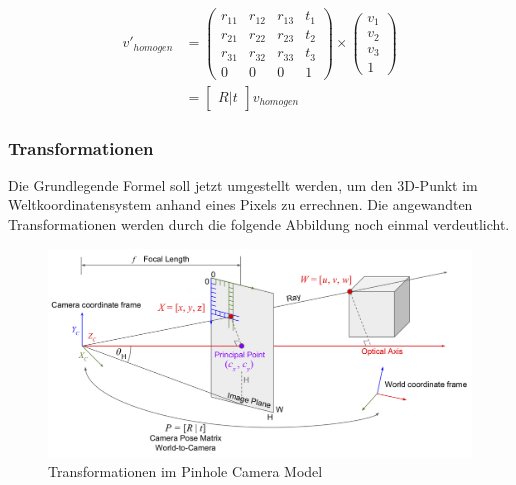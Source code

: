 		\begin{equation}
			\begin{aligned}
				v'_{homogen} &= \begin{pmatrix}
				r_{11} & r_{12} & r_{13} & t_1 \\
				r_{21} & r_{22} & r_{23} & t_2 \\
				r_{31} & r_{32} & r_{33} & t_3 \\
				0 & 0 & 0 & 1
				\end{pmatrix} \times \begin{pmatrix}
				v_1 \\
				v_2 \\
				v_3 \\
				1
				\end{pmatrix} \\
				&= \begin{bmatrix}
				R|t
				\end{bmatrix} v_{homogen}
			\end{aligned}
		\label{eq:rot_trans_homgen}
		\end{equation}
		
		\subsubsection{Transformationen}
		Die Grundlegende Formel soll jetzt umgestellt werden, um den 3D-Punkt im Weltkoordinatensystem anhand eines Pixels zu errechnen. Die angewandten Transformationen werden durch die folgende Abbildung noch einmal verdeutlicht.
		
		\begin{figure}[h]
			\centering
			\includegraphics[width=0.9\linewidth]{img/grundlagen/pinhole_camera_model_2.png}
			\caption[Transformationen]{Transformationen im Pinhole Camera Model}
			\label{fig:pinhole-camera-model_transformations}
		\end{figure}
		
